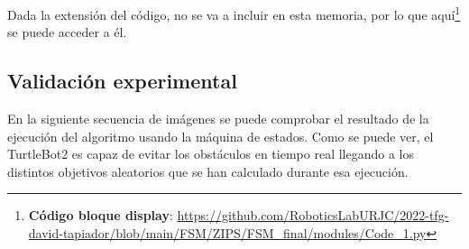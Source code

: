 Dada la extensión del código, no se va a incluir en esta memoria, por lo que
aquí\footnote{\textbf{Código bloque display}: \url{https://github.com/RoboticsLabURJC/2022-tfg-david-tapiador/blob/main/FSM/ZIPS/FSM_final/modules/Code_1.py}}
se puede acceder a él.

\subsection{Validación experimental}
\label{subsec:val_exp_FSM}

En la siguiente secuencia de imágenes se puede comprobar el resultado de la ejecución del algoritmo usando la máquina de estados. Como se puede ver, el TurtleBot2 es capaz de
evitar los obstáculos en tiempo real llegando a los distintos objetivos aleatorios que se han calculado durante esa ejecución.

